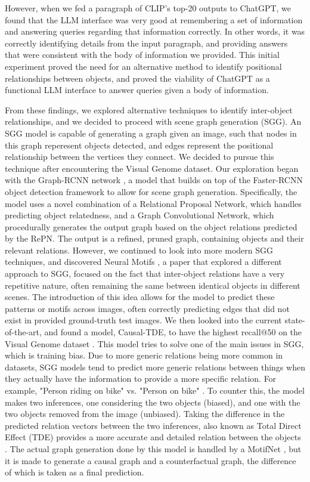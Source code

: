 \documentclass[letterpaper, 10 pt, conference]{ieeeconf}  %
\begin{document}
    However, when we fed a paragraph of CLIP's top-20 outputs to ChatGPT, we found that the LLM interface was very good at remembering a set of information and answering queries regarding that information correctly. In other words, it was correctly identifying details from the input paragraph, and providing answers that were consistent with the body of information we provided. This initial experiment proved the need for an alternative method to identify positional relationships between objects, and proved the viability of ChatGPT as a functional LLM interface to answer queries given a body of information.

    From these findings, we explored alternative techniques to identify inter-object relationships, and we decided to proceed with scene graph generation (SGG). An SGG model is capable of generating a graph given an image, such that nodes in this graph reperesent objects detected, and edges represent the positional relationship between the vertices they connect. We decided to pursue this technique after encountering the Visual Genome dataset. Our exploration began with the Graph-RCNN network \cite{yang2018graph}, a model that builds on top of the Faster-RCNN object detection framework to allow for scene graph generation. Specifically, the model uses a novel combination of a Relational Proposal Network, which handles predicting object relatedness, and a Graph Convolutional Network, which procedurally generates the output graph based on the object relations predicted by the RePN. The output is a refined, pruned graph, containing objects and their relevant relations. However, we continued to look into more modern SGG techniques, and discovered Neural Motifs \cite{zellers2018scenegraphs}, a paper that explored a different approach to SGG, focused on the fact that inter-object relations have a very repetitive nature, often remaining the same between identical objects in different scenes. The introduction of this idea allows for the model to predict these patterns or motifs across images, often correctly predicting edges that did not exist in provided ground-truth test images. We then looked into the current state-of-the-art, and found a model, Causal-TDE, to have the highest recall@50 on the Visual Genome dataset \cite{latestinML}. This model tries to solve one of the main issues in SGG, which is training bias. Due to more generic relations being more common in datasets, SGG models tend to predict more generic relations between things when they actually have the information to provide a more specific relation. For example, "Person riding on bike" vs. "Person on bike" \cite{tang2020unbiased}. To counter this, the model makes two inferences, one considering the two objects (biased), and one with the two objects removed from the image (unbiased). Taking the difference in the predicted relation vectors between the two inferences, also known as Total Direct Effect (TDE) provides a more accurate and detailed relation between the objects \cite{tang2020unbiased}. The actual graph generation done by this model is handled by a MotifNet \cite{zellers2018scenegraphs}, but it is made to generate a causal graph and a counterfactual graph, the difference of which is taken as a final prediction. 
\end{document}

